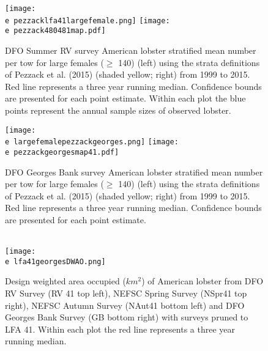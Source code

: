\documentclass[11pt]{article}
\newcommand{\e}{/backup/bio_data/bio.lobster/figures/} %
\begin{document}
\begin{landscape}
\begin{figure}
\centering
    \texttt{[image: \\e pezzacklfa41largefemale.png]} 
    \texttt{[image: \\e pezzack480481map.pdf]} 
    
    \caption{DFO Summer RV survey American lobster stratified mean number per tow for large females ($\geq$ 140) (left) using the strata definitions of Pezzack et al. (2015) (shaded yellow; right) from 1999 to 2015. Red line represents a three year running median. Confidence bounds are presented for each point estimate. Within each plot the blue points represent the annual sample sizes of observed lobster.}

\end{figure}
\end{landscape}

\begin{landscape}
\begin{figure}
\centering
    \texttt{[image: \\e largefemalepezzackgeorges.png]} 
     \texttt{[image: \\e pezzackgeorgesmap41.pdf]} 
    
    \caption{DFO Georges Bank survey American lobster stratified mean number per tow for large females ($\geq$ 140) (left) using the strata definitions of Pezzack et al. (2015) (shaded yellow; right) from 1999 to 2015. Red line represents a three year running median. Confidence bounds are presented for each point estimate. }

\end{figure}
\end{landscape}


\begin{figure}
\centering
{}
\\
    \texttt{[image: \\e lfa41georgesDWAO.png]}

\caption{Design weighted area occupied ($km^2$) of American lobster from DFO RV Survey (RV 41 top left), NEFSC Spring Survey (NSpr41 top right), NEFSC Autumn Survey (NAut41 bottom left) and DFO Georges Bank Survey (GB bottom right) with surveys pruned to LFA 41. Within each plot the red line represents a three year running median. }
\end{figure}
\clearpage
\end{document}
